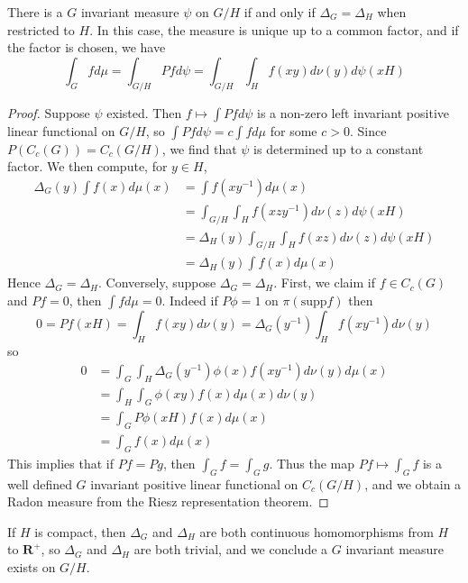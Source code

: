 \begin{theorem}
    There is a $G$ invariant measure $\psi$ on $G/H$ if and only if $\Delta_G = \Delta_H$ when restricted to $H$. In this case, the measure is unique up to a common factor, and if the factor is chosen, we have
    \[ \int_G f d\mu = \int_{G/H} Pf d\psi = \int_{G/H} \int_H f(xy) d\nu(y) d\psi(xH) \]
\end{theorem}
\begin{proof}
    Suppose $\psi$ existed. Then $f \mapsto \int Pf d \psi$ is a non-zero left invariant positive linear functional on $G/H$, so $\int Pf d\psi = c \int f d\mu$ for some $c > 0$. Since $P(C_c(G)) = C_c(G/H)$, we find that $\psi$ is determined up to a constant factor. We then compute, for $y \in H$,
    \begin{align*}
        \Delta_G(y) \int f(x) d\mu(x) &= \int f(xy^{-1}) d\mu(x)\\
        &= \int_{G/H} \int_H f(xzy^{-1}) d\nu(z) d\psi(xH)\\
        &= \Delta_H(y) \int_{G/H} \int_H f(xz) d\nu(z) d\psi(xH)\\
        &= \Delta_H(y) \int f(x) d\mu(x)
    \end{align*}
    Hence $\Delta_G = \Delta_H$. Conversely, suppose $\Delta_G = \Delta_H$. First, we claim if $f \in C_c(G)$ and $Pf = 0$, then $\int f d\mu = 0$. Indeed if $P\phi = 1$ on $\pi(\text{supp} f)$ then
    \[ 0 = Pf(xH) = \int_H f(xy) d\nu(y) = \Delta_G(y^{-1}) \int_H f(xy^{-1}) d\nu(y) \]
    so
    \begin{align*}
        0 &= \int_G \int_H \Delta_G(y^{-1}) \phi(x) f(xy^{-1}) d\nu(y) d\mu(x)\\
        &= \int_H \int_G \phi(xy) f(x) d\mu(x) d\nu(y)\\
        &= \int_G P\phi(xH) f(x) d\mu(x)\\
        &= \int_G f(x) d\mu(x)
    \end{align*}
    This implies that if $Pf = Pg$, then $\int_G f = \int_G g$. Thus the map $Pf \mapsto \int_G f$ is a well defined $G$ invariant positive linear functional on $C_c(G/H)$, and we obtain a Radon measure from the Riesz representation theorem.
\end{proof}

If $H$ is compact, then $\Delta_G$ and $\Delta_H$ are both continuous homomorphisms from $H$ to $\mathbf{R}^+$, so $\Delta_G$ and $\Delta_H$ are both trivial, and we conclude a $G$ invariant measure exists on $G/H$.

